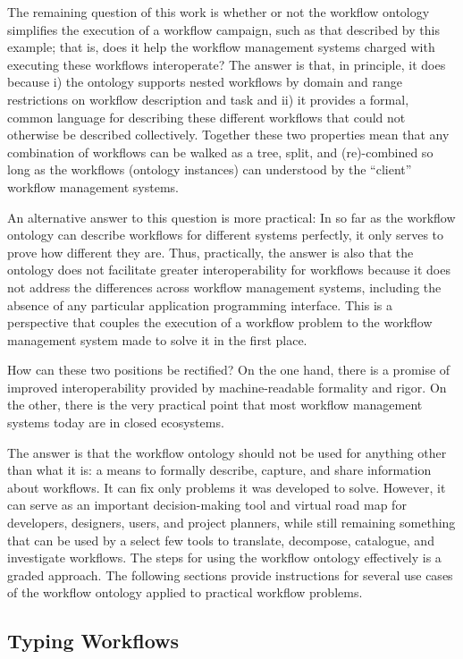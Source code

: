 The remaining question of this work is whether or not the workflow ontology
simplifies the execution of a workflow campaign, such as that described by
this example; that is, does it help the workflow management systems charged with
executing these workflows interoperate? The answer is that, in principle, it
does because i) the ontology supports nested workflows by domain and range
restrictions on workflow description and task and ii) it provides a formal,
common language for describing these different workflows that could not
otherwise be described collectively. Together these two properties mean that
any combination of workflows can be walked as a tree, split, and (re)-combined
so long as the workflows (ontology instances) can understood by the ``client''
workflow management systems.

An alternative answer to this question is more practical: In so far as the
workflow ontology can describe workflows for different systems perfectly, it
only serves to prove how different they are. Thus, practically, the answer is
also that the ontology does not facilitate greater interoperability for
workflows because it does not address the differences across workflow
management systems, including the absence of any particular application
programming interface. This is a perspective that couples the execution of a
workflow problem to the workflow management system made to solve it in the
first place.

How can these two positions be rectified? On the one hand, there is a promise of
improved interoperability provided by machine-readable formality and rigor. On
the other, there is the very practical point that most workflow management
systems today are in closed ecosystems.

The answer is that the workflow ontology should not be used for anything other
than what it is: a means to formally describe, capture, and share information
about workflows. It can fix only problems it was developed to solve. However, it
can serve as an important decision-making tool and virtual road map for
developers, designers, users, and project planners, while still remaining
something that can be used by a select few tools to translate, decompose,
catalogue, and investigate workflows. The steps for using the workflow ontology
effectively is a graded approach. The following sections provide instructions
for several use cases of the workflow ontology applied to practical workflow
problems.

\subsection{Typing Workflows}

